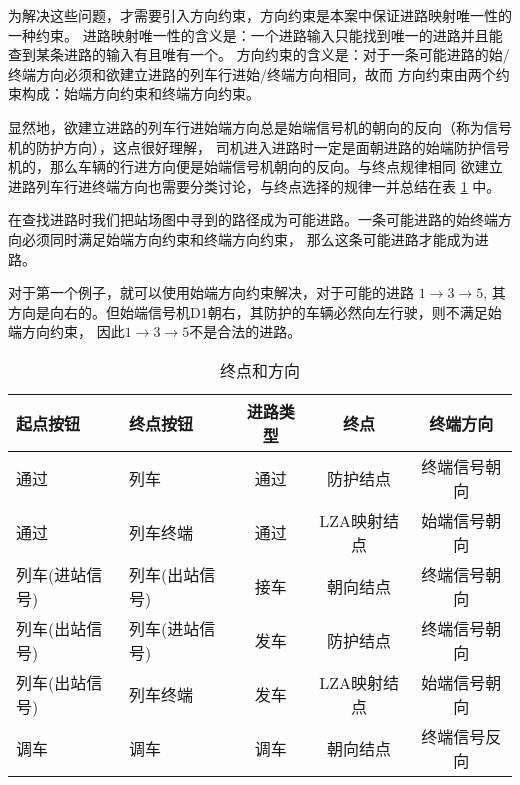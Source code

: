为解决这些问题，才需要引入方向约束，方向约束是本案中保证进路映射唯一性的一种约束。
进路映射唯一性的含义是：一个进路输入只能找到唯一的进路并且能查到某条进路的输入有且唯有一个。
方向约束的含义是：对于一条可能进路的始/终端方向必须和欲建立进路的列车行进始/终端方向相同，故而
方向约束由两个约束构成：始端方向约束和终端方向约束。

显然地，欲建立进路的列车行进始端方向总是始端信号机的朝向的反向（称为信号机的防护方向），这点很好理解，
司机进入进路时一定是面朝进路的始端防护信号机的，那么车辆的行进方向便是始端信号机朝向的反向。与终点规律相同
欲建立进路列车行进终端方向也需要分类讨论，与终点选择的规律一并总结在表 \ref{route_end} 中。

在查找进路时我们把站场图中寻到的路径成为可能进路。一条可能进路的始终端方向必须同时满足始端方向约束和终端方向约束，
那么这条可能进路才能成为进路。

对于第一个例子，就可以使用始端方向约束解决，对于可能的进路 $1 \rightarrow 3 \rightarrow 5$,
其方向是向右的。但始端信号机D1朝右，其防护的车辆必然向左行驶，则不满足始端方向约束，
因此$1 \rightarrow 3 \rightarrow 5$不是合法的进路。

\begin{table}[htpb!]
    \centering
    \caption{\label{route_end}终点和方向}
    \begin{threeparttable}
        \begin{tabular}{llccc}
            \toprule
            起点按钮       & 终点按钮       & 进路类型 & 终点        & 终端方向     \\
            \midrule
            通过           & 列车           & 通过     & 防护结点    & 终端信号朝向 \\
            通过           & 列车终端       & 通过     & LZA映射结点 & 始端信号朝向 \\
            列车(进站信号) & 列车(出站信号) & 接车     & 朝向结点    & 终端信号朝向 \\
            列车(出站信号) & 列车(进站信号) & 发车     & 防护结点    & 终端信号朝向 \\
            列车(出站信号) & 列车终端       & 发车     & LZA映射结点 & 始端信号朝向 \\
            调车           & 调车           & 调车     & 朝向结点    & 终端信号反向 \\

            \bottomrule
        \end{tabular}
    \end{threeparttable}
\end{table}

